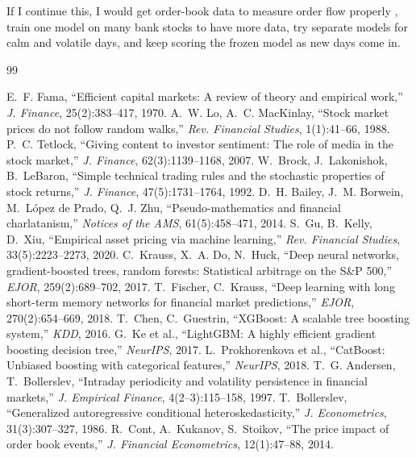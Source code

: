 \documentclass[11pt,a4paper]{article}
\begin{document}
If I continue this, I would get order-book data to measure order flow properly \cite{cont2014}, train one model on
many bank stocks to have more data, try separate models for calm and volatile days, and keep scoring the frozen model
as new days come in.

\onecolumn
\begin{thebibliography}{99}
\small\setlength{\itemsep}{2pt}
 E.~F. Fama, ``Efficient capital markets: A review of theory and empirical work,'' \emph{J. Finance}, 25(2):383--417, 1970.
 A.~W. Lo, A.~C. MacKinlay, ``Stock market prices do not follow random walks,'' \emph{Rev. Financial Studies}, 1(1):41--66, 1988.
 P.~C. Tetlock, ``Giving content to investor sentiment: The role of media in the stock market,'' \emph{J. Finance}, 62(3):1139--1168, 2007.
 W.~Brock, J.~Lakonishok, B.~LeBaron, ``Simple technical trading rules and the stochastic properties of stock returns,'' \emph{J. Finance}, 47(5):1731--1764, 1992.
 D.~H. Bailey, J.~M. Borwein, M.~L\'opez de Prado, Q.~J. Zhu, ``Pseudo-mathematics and financial charlatanism,'' \emph{Notices of the AMS}, 61(5):458--471, 2014.
 S.~Gu, B.~Kelly, D.~Xiu, ``Empirical asset pricing via machine learning,'' \emph{Rev. Financial Studies}, 33(5):2223--2273, 2020.
 C.~Krauss, X.~A. Do, N.~Huck, ``Deep neural networks, gradient-boosted trees, random forests: Statistical arbitrage on the S\&P 500,'' \emph{EJOR}, 259(2):689--702, 2017.
 T.~Fischer, C.~Krauss, ``Deep learning with long short-term memory networks for financial market predictions,'' \emph{EJOR}, 270(2):654--669, 2018.
 T.~Chen, C.~Guestrin, ``XGBoost: A scalable tree boosting system,'' \emph{KDD}, 2016.
 G.~Ke et al., ``LightGBM: A highly efficient gradient boosting decision tree,'' \emph{NeurIPS}, 2017.
 L.~Prokhorenkova et al., ``CatBoost: Unbiased boosting with categorical features,'' \emph{NeurIPS}, 2018.
 T.~G. Andersen, T.~Bollerslev, ``Intraday periodicity and volatility persistence in financial markets,'' \emph{J. Empirical Finance}, 4(2--3):115--158, 1997.
 T.~Bollerslev, ``Generalized autoregressive conditional heteroskedasticity,'' \emph{J. Econometrics}, 31(3):307--327, 1986.
 R.~Cont, A.~Kukanov, S.~Stoikov, ``The price impact of order book events,'' \emph{J. Financial Econometrics}, 12(1):47--88, 2014.

\end{thebibliography}
\end{document}

